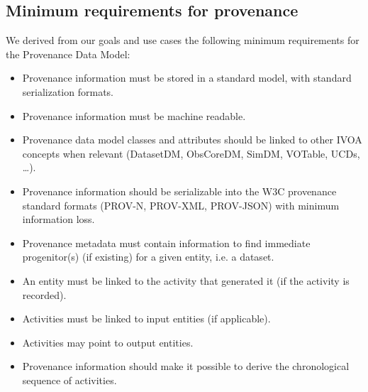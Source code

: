 \subsection{Minimum requirements for provenance}\label{sec:requirements}

We derived from our goals and use cases the following minimum requirements for the Provenance Data Model:

\begin{itemize}



\item Provenance information must be stored in a standard model, with standard serialization formats.

\item Provenance information must be machine readable.

\item Provenance data model classes and attributes should be linked to other IVOA concepts when relevant (DatasetDM, ObsCoreDM, SimDM, VOTable, UCDs, \ldots).

\item Provenance information should be serializable into the W3C provenance standard formats (PROV-N, PROV-XML, PROV-JSON) with minimum information loss.



\item Provenance metadata must contain information to find immediate progenitor(s) (if existing) for a given entity, i.e. a dataset.


\item An entity must be linked to the activity that generated it (if the activity is recorded).

\item Activities must be linked to input entities (if applicable).

\item Activities may point to output entities.

\item Provenance information should make it possible to derive the chronological sequence of activities.

\end{itemize}

